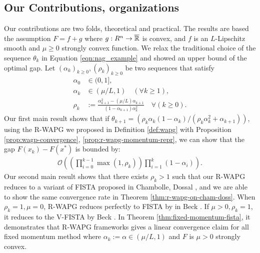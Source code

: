 \documentclass[12pt]{article}
\begin{document}
    \subsection{Our Contributions, organizations}
        Our contributions are two folds, theoretical and practical. 
        The results are based the assumption $F = f + g$ where $g:R^n \rightarrow \overline{\mathbb R}$ is convex, and $f$ is an $L$-Lipschitz smooth and $\mu \ge 0$ strongly convex function. 
        We relax the traditional choice of the sequence $\theta_k$ in Equation \ref{eqn:nag_example} and showed an upper bound of the optimal gap. 
        Let $(\alpha_k)_{k \ge0}, (\rho_k)_{k \ge 0}$ be two sequences that satisfy
        \begin{align*}
            \alpha_0 &\in (0, 1], 
            \\
            \alpha_k &\in (\mu/L, 1) \quad (\forall k \ge 1), 
            \\
            \rho_k &:= \frac{\alpha_{k + 1}^2 - (\mu/L)\alpha_{k + 1}}{(1 - \alpha_{k + 1})\alpha_k^2} \quad \forall (k \ge 0). 
        \end{align*}
        Our first main result shows that if $\theta_{k + 1} = (\rho_k\alpha_k(1 - \alpha_k)/(\rho_k\alpha_k^2 + \alpha_{k + 1}))$, using the R-WAPG we proposed in Definition \ref{def:wapg} with Proposition \ref{prop:wagp-convergence}, \ref{prop:r-wapg-momentum-repr}, we can show that the gap $F(x_k) - F(x^*)$ is bounded by:
        \begin{align*}
            \mathcal O\left(
                \left(
                    \prod_{i = 0}^{k - 1} \max(1, \rho_{k})
                \right)
                \prod_{i = 1}^{k} \left(1  - \alpha_i\right)
            \right). 
        \end{align*}
        Our second main result shows that there exists $\rho_k > 1$ such that our R-WAPG reduces to a variant of FISTA proposed in 
        Chambolle, Dossal \cite{chambolle_convergence_2015}, and we are able to show the same convergence rate in Theorem \ref{thm:r-wapg-on-cham-doss}. 
        When $\rho_k = 1, \mu = 0$, R-WAPG reduces perfectly to FISTA by in Beck \cite{beck_fast_2009}.
        If $\mu > 0, \rho_k = 1$, it reduces to the V-FISTA by Beck \cite{beck_first-order_2017}. 
        In Theorem \ref{thm:fixed-momentum-fista}, it demonstrates that R-WAPG frameworks gives a linear convergence claim for all fixed momentum method where $\alpha_k := \alpha \in (\mu/L, 1)$ and  $F$ is $\mu > 0$ strongly convex. 
        \par
\end{document}
